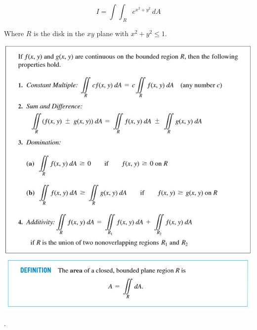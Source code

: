 \documentclass[11pt]{article}
\begin{document}
$$I = \int \int_{\; R} e^{x^2+y^2} \, dA$$

Where $R$ is the disk in the $xy$ plane with $x^2 + y^2 \leq 1$.

\includegraphics[scale = 0.85]{Capture4.jpg}\\
\includegraphics{Capture5.jpg}

\newpage

.

\newpage
\end{document}
